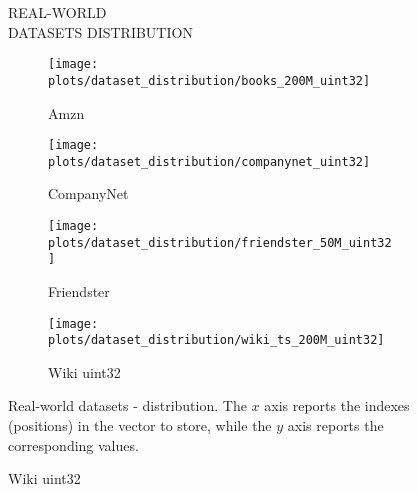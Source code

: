 \documentclass{article}
\begin{document}
\begin{figure}[!htbp]
\fbox
{
\begin{minipage}[t][0.98\textheight][t]{\textwidth}
\centering
    \vspace{20px}
    \begin{minipage}{0.95\linewidth}
    REAL-WORLD \\ DATASETS DISTRIBUTION
    \end{minipage}
    \vspace{20px}

   \begin{minipage}{0.45\linewidth}
        \begin{figure}[H]
        \texttt{[image: plots/dataset\_distribution/books\_200M\_uint32]}
        \caption{Amzn}
        \end{figure}
    \end{minipage}
    \begin{minipage}{0.45\linewidth}
        \begin{figure}[H]
            \texttt{[image: plots/dataset\_distribution/companynet\_uint32]}
            \caption{CompanyNet}
        \end{figure}
    \end{minipage}

    \vfill

    \begin{minipage}{0.45\linewidth}
        \begin{figure}[H]
        \texttt{[image: plots/dataset\_distribution/friendster\_50M\_uint32]}
        \caption{Friendster}
        \end{figure}
    \end{minipage}
    \begin{minipage}{0.45\linewidth}
        \begin{figure}[H]
            \texttt{[image: plots/dataset\_distribution/wiki\_ts\_200M\_uint32]}
            \caption{Wiki uint32}
        \end{figure}
    \end{minipage}
    
    \vfill
    \centering
    \begin{minipage}{\linewidth}
    Real-world datasets - distribution. The $x$ axis reports the indexes (positions) in the vector to store, while the $y$ axis reports the corresponding values.
    \end{minipage}
    \vspace{10px}
\end{minipage}
}
\end{figure}
\end{document}
